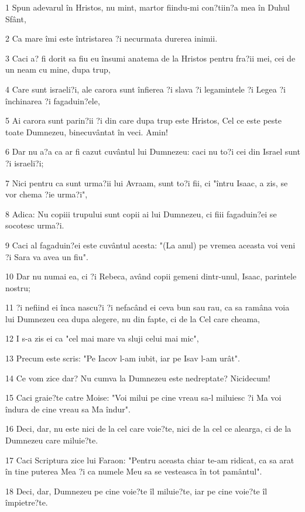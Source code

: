 \par 1 Spun adevarul în Hristos, nu mint, martor fiindu-mi con?tiin?a mea în Duhul Sfânt,
\par 2 Ca mare îmi este întristarea ?i necurmata durerea inimii.
\par 3 Caci a? fi dorit sa fiu eu însumi anatema de la Hristos pentru fra?ii mei, cei de un neam cu mine, dupa trup,
\par 4 Care sunt israeli?i, ale carora sunt înfierea ?i slava ?i legamintele ?i Legea ?i închinarea ?i fagaduin?ele,
\par 5 Ai carora sunt parin?ii ?i din care dupa trup este Hristos, Cel ce este peste toate Dumnezeu, binecuvântat în veci. Amin!
\par 6 Dar nu a?a ca ar fi cazut cuvântul lui Dumnezeu: caci nu to?i cei din Israel sunt ?i israeli?i;
\par 7 Nici pentru ca sunt urma?ii lui Avraam, sunt to?i fii, ci "întru Isaac, a zis, se vor chema ?ie urma?i",
\par 8 Adica: Nu copiii trupului sunt copii ai lui Dumnezeu, ci fiii fagaduin?ei se socotesc urma?i.
\par 9 Caci al fagaduin?ei este cuvântul acesta: "(La anul) pe vremea aceasta voi veni ?i Sara va avea un fiu".
\par 10 Dar nu numai ea, ci ?i Rebeca, având copii gemeni dintr-unul, Isaac, parintele nostru;
\par 11 ?i nefiind ei înca nascu?i ?i nefacând ei ceva bun sau rau, ca sa ramâna voia lui Dumnezeu cea dupa alegere, nu din fapte, ci de la Cel care cheama,
\par 12 I s-a zis ei ca "cel mai mare va sluji celui mai mic",
\par 13 Precum este scris: "Pe Iacov l-am iubit, iar pe Isav l-am urât".
\par 14 Ce vom zice dar? Nu cumva la Dumnezeu este nedreptate? Nicidecum!
\par 15 Caci graie?te catre Moise: "Voi milui pe cine vreau sa-l miluiesc ?i Ma voi îndura de cine vreau sa Ma îndur".
\par 16 Deci, dar, nu este nici de la cel care voie?te, nici de la cel ce alearga, ci de la Dumnezeu care miluie?te.
\par 17 Caci Scriptura zice lui Faraon: "Pentru aceasta chiar te-am ridicat, ca sa arat în tine puterea Mea ?i ca numele Meu sa se vesteasca în tot pamântul".
\par 18 Deci, dar, Dumnezeu pe cine voie?te îl miluie?te, iar pe cine voie?te îl împietre?te.
